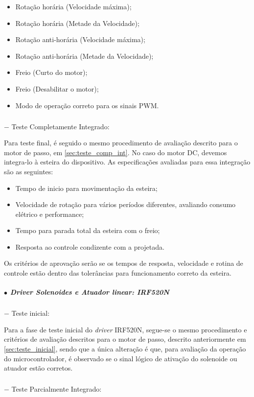 \begin{itemize}
    \item Rotação horária (Velocidade máxima);
    \item Rotação horária (Metade da Velocidade);
    \item Rotação anti-horária  (Velocidade máxima);
    \item Rotação anti-horária  (Metade da Velocidade);
    \item Freio (Curto do motor);
    \item Freio (Desabilitar o motor);
    \item Modo de operação correto para os sinais PWM.
\end{itemize}

\subparagraph*{} $-$ Teste Completamente Integrado:

Para teste final, é seguido o mesmo procedimento de avaliação descrito para o motor de passo, em \ref{sec:teste_comp_int}. No caso do motor DC, devemos integra-lo à esteira do dispositivo. As especificações avaliadas para essa integração são as seguintes:

\begin{itemize}
    \item Tempo de inicio para movimentação da esteira;
    \item Velocidade de rotação para vários períodos diferentes, avaliando consumo elétrico e performance;
    \item Tempo para parada total da esteira com o freio;
    \item Resposta ao controle condizente com a  projetada.
\end{itemize}

Os critérios de aprovação serão se os tempos de resposta, velocidade e rotina de controle estão dentro das tolerâncias para funcionamento correto da esteira.

\subparagraph*{$\bullet$ \textit{Driver} Solenoides e Atuador linear: IRF520N} \hfill

\subparagraph*{} $-$ Teste inicial:

Para a fase de teste inicial do \textit{driver} IRF520N, segue-se o mesmo procedimento e critérios de avaliação descritos para o motor de passo, descrito anteriormente em \ref{sec:teste_inicial}, sendo que a única alteração é que, para avaliação da operação do microcontrolador, é observado se o sinal lógico de ativação do solenoide ou atuador estão corretos.

\subparagraph*{} $-$ Teste Parcialmente Integrado:

